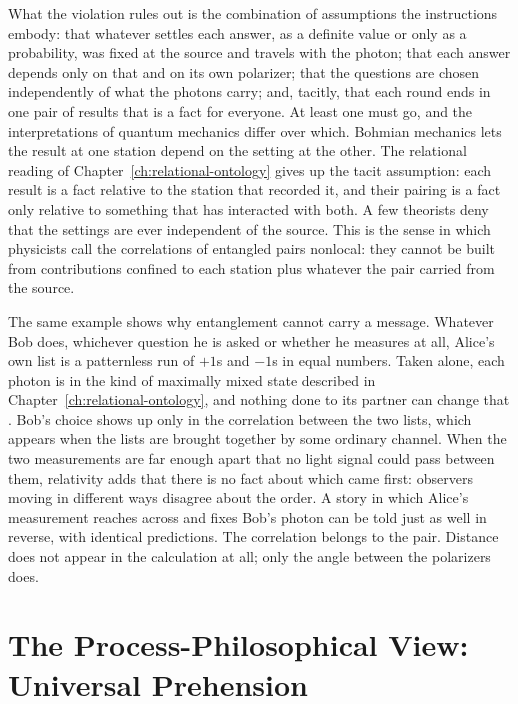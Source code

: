 What the violation rules out is the combination of assumptions the instructions embody: that whatever settles each answer, as a definite value or only as a probability, was fixed at the source and travels with the photon; that each answer depends only on that and on its own polarizer; that the questions are chosen independently of what the photons carry; and, tacitly, that each round ends in one pair of results that is a fact for everyone. At least one must go, and the interpretations of quantum mechanics differ over which. Bohmian mechanics lets the result at one station depend on the setting at the other. The relational reading of Chapter~\ref{ch:relational-ontology} gives up the tacit assumption: each result is a fact relative to the station that recorded it, and their pairing is a fact only relative to something that has interacted with both. A few theorists deny that the settings are ever independent of the source. This is the sense in which physicists call the correlations of entangled pairs nonlocal: they cannot be built from contributions confined to each station plus whatever the pair carried from the source.

The same example shows why entanglement cannot carry a message. Whatever Bob does, whichever question he is asked or whether he measures at all, Alice's own list is a patternless run of $+1$s and $-1$s in equal numbers. Taken alone, each photon is in the kind of maximally mixed state described in Chapter~\ref{ch:relational-ontology}, and nothing done to its partner can change that \citep{NielsenChuang2000}. Bob's choice shows up only in the correlation between the two lists, which appears when the lists are brought together by some ordinary channel. When the two measurements are far enough apart that no light signal could pass between them, relativity adds that there is no fact about which came first: observers moving in different ways disagree about the order. A story in which Alice's measurement reaches across and fixes Bob's photon can be told just as well in reverse, with identical predictions. The correlation belongs to the pair. Distance does not appear in the calculation at all; only the angle between the polarizers does.

\section{The Process-Philosophical View: Universal Prehension}
\label{sec:ch8-process}

